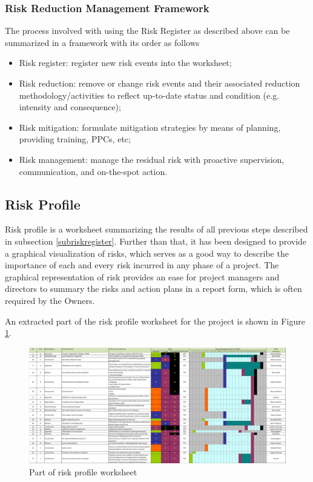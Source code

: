 \documentclass[10pt,halfline,a4paper]{ouparticle}
\begin{document}
\subsubsection{Risk Reduction Management Framework}
The process involved with using the Risk Register as described above can be summarized in a framework with its order as follows
\begin{itemize}
	\item Risk register: register new risk events into the worksheet;
	\item Risk reduction: remove or change risk events and their associated reduction methodology/activities to reflect up-to-date status and condition (e.g. intensity and consequence);
	\item Risk mitigation: formulate mitigation strategies by means of planning, providing training, PPCs, etc;
	\item Risk management: manage the residual risk with proactive supervision, communication, and on-the-spot action.
	
\end{itemize}

\subsection{Risk Profile}
Risk profile is a worksheet summarizing the results of all previous steps described in subsection \ref{subriskregister}. Further than that, it has been designed to provide a graphical visualization of risks, which serves as a good way to describe the importance of each and every risk incurred in any phase of a project. The graphical representation of risk provides an ease for project managers and directors to summary the risks and action plans in a report form, which is often required by the Owners.

An extracted part of the risk profile worksheet for the project is shown in Figure \ref{fig_riskprofile}.

\begin{figure}
	\centering \includegraphics[scale=0.3]{riskprofile} \caption{Part of risk profile worksheet}
	\label{fig_riskprofile} 
\end{figure}
\end{document}
